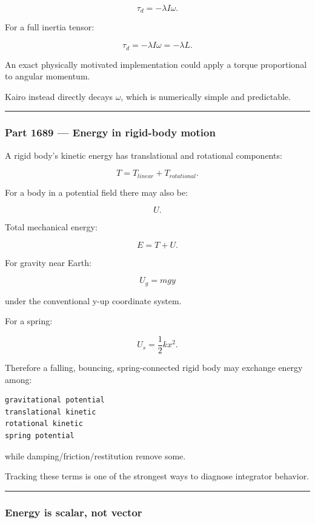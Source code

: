 \[
\boxed{
\tau_d
=
-\lambda I\omega.
}
\]

For a full inertia tensor:

\[
\tau_d
=
-\lambda I\omega
=
-\lambda L.
\]

An exact physically motivated implementation could apply a torque proportional to angular momentum.

Kairo instead directly decays \(\omega\), which is numerically simple and predictable.

\begin{center}\rule{0.5\linewidth}{0.5pt}\end{center}

\subsubsection{Part 1689 --- Energy in rigid-body motion}\label{part-1689-energy-in-rigid-body-motion}

A rigid body's kinetic energy has translational and rotational components:

\[
\boxed{
T
=
T_{linear}
+
T_{rotational}.
}
\]

For a body in a potential field there may also be:

\[
U.
\]

Total mechanical energy:

\[
\boxed{
E=T+U.
}
\]

For gravity near Earth:

\[
U_g
=
mgy
\]

under the conventional y-up coordinate system.

For a spring:

\[
U_s
=
\frac12kx^2.
\]

Therefore a falling, bouncing, spring-connected rigid body may exchange energy among:

\begin{verbatim}
gravitational potential
translational kinetic
rotational kinetic
spring potential
\end{verbatim}

while damping/friction/restitution remove some.

Tracking these terms is one of the strongest ways to diagnose integrator behavior.

\begin{center}\rule{0.5\linewidth}{0.5pt}\end{center}

\subsubsection{Energy is scalar, not vector}\label{energy-is-scalar-not-vector}

